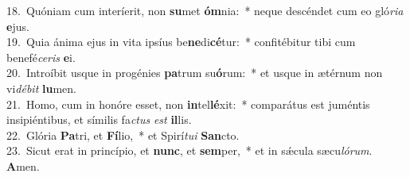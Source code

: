 {18.~}Quóniam cum interíerit, non \textbf{su}met \textbf{óm}nia:~* neque descéndet cum eo gló\textit{ri}\textit{a} \textbf{e}jus.\\
{19.~}Quia ánima ejus in vita ipsíus be\textbf{ne}di\textbf{cé}tur:~* confitébitur tibi cum benefé\textit{ce}\textit{ris} \textbf{e}i.\\
{20.~}Introíbit usque in progénies \textbf{pa}trum su\textbf{ó}rum:~* et usque in ætérnum non vi\textit{dé}\textit{bit} \textbf{lu}men.\\
{21.~}Homo, cum in honóre esset, non \textbf{in}tel\textbf{lé}xit:~* comparátus est juméntis insipiéntibus, et símilis fa\textit{ctus} \textit{est} \textbf{il}lis.\\
{22.~}Glória \textbf{Pa}tri, et \textbf{Fí}lio,~* et Spirí\textit{tu}\textit{i} \textbf{San}cto.\\
{23.~}Sicut erat in princípio, et \textbf{nunc}, et \textbf{sem}per,~* et in sǽcula sæcu\textit{ló}\textit{rum}. \textbf{A}men.\\
